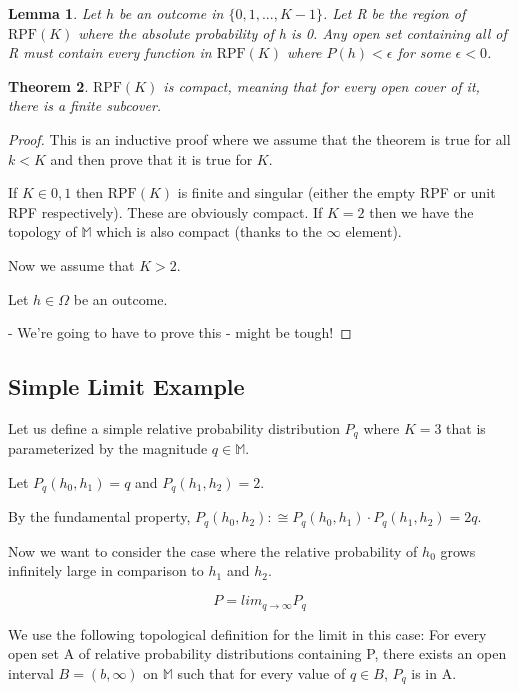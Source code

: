 \documentclass[twoside]{article}
\theoremstyle{plain}%
\newtheorem{theorem}{Theorem}[section]
\newtheorem{lemma}[theorem]{Lemma}
\theoremstyle{definition}
\theoremstyle{remark}
\begin{document}
\begin{lemma}
Let \(h\) be an outcome in \(\{0, 1, ..., K-1\}\). Let R be the region of \(\text{RPF}(K)\) where the absolute probability of h is 0. Any open set containing all of R must contain every function in \(\text{RPF}(K)\) where \(P(h) < \epsilon\) for some \(\epsilon < 0\).
\end{lemma}

\begin{theorem}
\(\text{RPF}(K)\) is \textit{compact}, meaning that for every open cover of it, there is a finite subcover.
\end{theorem}

\begin{proof}
This is an inductive proof where we assume that the theorem is true for all \(k < K\) and then prove that it is true for \(K\).

If \(K \in {0, 1}\) then \(\text{RPF}(K)\) is finite and singular (either the empty RPF or unit RPF respectively). These are obviously compact. If \(K = 2\) then we have the topology of \(\mathbb{M}\) which is also compact (thanks to the \(\infty\) element).

Now we assume that \(K > 2\).

Let \(h \in \Omega\) be an outcome.


- We're going to have to prove this - might be tough!
\end{proof}

\subsection{Simple Limit Example}

Let us define a simple relative probability distribution \(P_q\) where \(K = 3\) that is parameterized by the magnitude \(q \in \mathbb{M}\).

Let \(P_q(h_0, h_1) = q\) and \(P_q(h_1, h_2) = 2\).

By the fundamental property, \(P_q(h_0, h_2) :\cong P_q(h_0, h_1) \cdot P_q(h_1, h_2) = 2q\).

Now we want to consider the case where the relative probability of \(h_0\) grows infinitely large in comparison to \(h_1\) and \(h_2\).

\[P = lim_{q \rightarrow \infty} P_q\]

We use the following topological definition for the limit in this case: For every open set A of relative probability distributions containing P, there exists an open interval \(B=(b, \infty)\) on \(\mathbb{M}\) such that for every value of \(q \in B\), \(P_q\) is in A.
\end{document}
